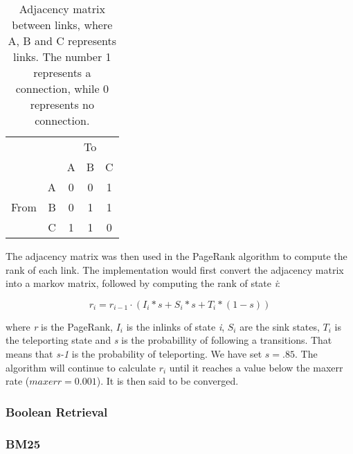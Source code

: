 \begin{table}[!h]
  \centering
  \begin{tabular}{|lr|c|c|c|} \cline{3-5}
  \multicolumn{1}{l}{} && \multicolumn{3}{c|}{To} \\ \cline{3-5}
  \multicolumn{1}{l}{} & & A & B & C  \\ \hline
  \multirow{3}{*}{\begin{sideways}From\end{sideways}}
  & \multicolumn{1}{|r|}{A} & 0 & 0 & 1  \\ \cline{2-5}
  & \multicolumn{1}{|r|}{B} & 0 & 1 & 1  \\ \cline{2-5}
  & \multicolumn{1}{|r|}{C} & 1 & 1 & 0  \\ \hline
  \end{tabular}
  \caption{Adjacency matrix between links, where A, B and C represents links. The number 1 represents a connection, while 0 represents no connection.}
  \label{fig:adj_mx}
\end{table}

The adjacency matrix was then used in the PageRank algorithm to compute the rank of each link. The implementation would first convert the adjacency matrix into a markov matrix, followed by computing the rank of state \emph{i}:

$$ r_i = r_{i-1} \cdot (I_i *s + S_i * s + T_i * (1-s)) $$ 

where \emph{r} is the PageRank, \emph{$I_i$} is the inlinks of state \emph{i}, \emph{$S_i$} are the sink states, \emph{$T_i$} is the teleporting state and \emph{s} is the probabillity of following a transitions. That means that \emph{s-1} is the probability of teleporting. We have set $s=.85$. The algorithm will continue to calculate \emph{$r_i$} until it reaches a value below the maxerr rate ($maxerr = 0.001$). It is then said to be converged.



\subsubsection{Boolean Retrieval} %
\label{ssub:boolean_retrieval}


\subsubsection{BM25} %
\label{ssub:BM25}

